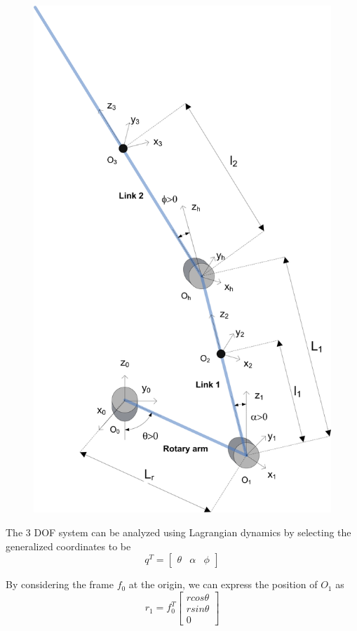 \documentclass[12pt,letterpaper]{article}
\begin{document}
\begin{figure}[H]
\centering
\includegraphics[scale=0.1]{img/model.png}
\label{fig:model}
\end{figure}

The 3 DOF system can be analyzed using Lagrangian dynamics by selecting the generalized coordinates to be $$q^T = \begin{bmatrix}\theta&\alpha&\phi\end{bmatrix}$$

By considering the frame $f_0$ at the origin, we can express the position of $O_1$ as $$r_1 = f_0^T \begin{bmatrix}r cos \theta\\r sin \theta\\0\end{bmatrix}$$
\end{document}
